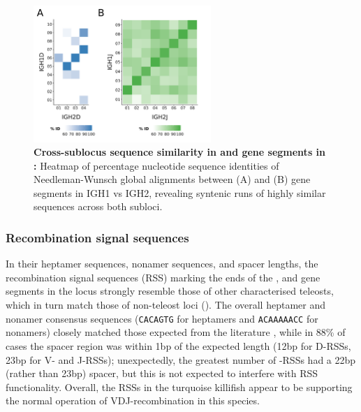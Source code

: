 \begin{figure}
	\label{fig:nfu-vh-families}
	\end{figure}


\begin{figure}
\centering
	\centering
	\begin{subfigure}{0em}
    \label{fig:nfu-dj-alignment-a}
    \end{subfigure}
    \begin{subfigure}{0em}
    \label{fig:nfu-dj-alignment-b}
    \end{subfigure}

\includegraphics[width=0.6\textwidth]{_Figures/png/nfu-dj-aln}
\caption[Cross-sublocus sequence similarity in \dh and \jh gene segments in \Nfu]{\textbf{Cross-sublocus sequence similarity in \dh and \jh gene segments in \Nfu:} Heatmap of percentage nucleotide sequence identities of Needleman-Wunsch global alignments between (A) \dh and (B) \jh gene segments in IGH1 vs IGH2, revealing syntenic runs of highly similar sequences across both subloci.}
\label{fig:nfu-dj-alignment}
\end{figure}

	\subsubsection{Recombination signal sequences}
	
	In their heptamer sequences, nonamer sequences, and spacer lengths, the recombination signal sequences (RSS) marking the ends of the \vh, \dh and \jh gene segments in the \Nfu locus strongly resemble those of other characterised teleosts, which in turn match those of non-teleost loci (). The overall heptamer and nonamer consensus sequences (\texttt{CACAGTG} for heptamers and \texttt{ACAAAAACC} for nonamers) closely matched those expected from the literature \parencite{schroeder2010immunoglobulins}, while in 88\% of cases the spacer region was within 1bp of the expected length (12bp for D-RSSs, 23bp for V- and J-RSSs); unexpectedly, the greatest number of \vh-RSSs had a 22bp (rather than 23bp) spacer, but this is not expected to interfere with RSS functionality. Overall, the RSSs in the turquoise killifish appear to be supporting the normal operation of VDJ-recombination in this species.
	
